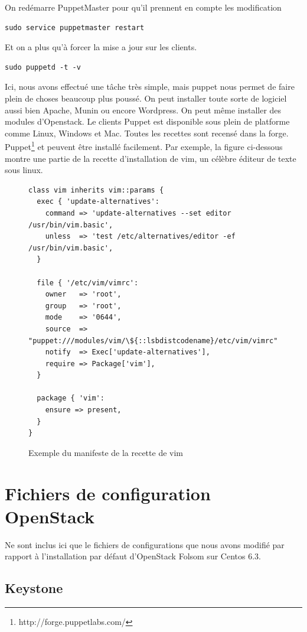 \documentclass[a4paper,oneside]{report}
\begin{document}
On redémarre PuppetMaster pour qu'il prennent en compte les modification
\begin{verbatim}
sudo service puppetmaster restart
\end{verbatim}

Et on a plus qu'à forcer la mise a jour sur les clients.
\begin{verbatim}
sudo puppetd -t -v
\end{verbatim}

Ici, nous avons effectué une tâche très simple, mais puppet nous permet de faire plein de choses beaucoup plus poussé. On peut installer toute sorte de logiciel aussi bien Apache, Munin ou encore Wordpress. 
On peut même installer des modules d'Openstack.
Le clients Puppet est disponible sous plein de platforme comme Linux, Windows et Mac.
Toutes les recettes sont recensé dans la forge. Puppet\footnote{http://forge.puppetlabs.com/} et peuvent être installé facilement.
Par exemple, la figure ci-dessous montre une partie de la recette d'installation de vim, un célèbre éditeur de texte sous linux.

\begin{figure}[!h]
\begin{center}
\begin{Verbatim}[frame=single]
class vim inherits vim::params {
  exec { 'update-alternatives':
    command => 'update-alternatives --set editor /usr/bin/vim.basic',
    unless  => 'test /etc/alternatives/editor -ef /usr/bin/vim.basic',
  }

  file { '/etc/vim/vimrc':
    owner   => 'root',
    group   => 'root',
    mode    => '0644',
    source  => "puppet:///modules/vim/\${::lsbdistcodename}/etc/vim/vimrc",
    notify  => Exec['update-alternatives'],
    require => Package['vim'],
  }

  package { 'vim':
    ensure => present,
  }
}
\end{Verbatim}
\caption*{Exemple du manifeste de la recette de vim}
\end{center}
\end{figure}

\chapter{Fichiers de configuration OpenStack}
Ne sont inclus ici que le fichiers de configurations que nous avons modifié par rapport à l'installation par défaut d'OpenStack Folsom sur Centos 6.3.
\section{Keystone} \label{conf:Keystone}
\end{document}
